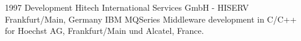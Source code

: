 \cventry
{1997}
{Development}
{}
{Hitech International Services GmbH - HISERV}
{Frankfurt/Main, Germany}
{
  IBM MQSeries Middleware development in C/C++ for Hoechst AG, Frankfurt/Main und Alcatel, France.
}
